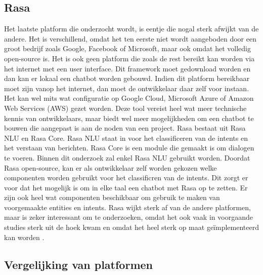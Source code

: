 \subsection{Rasa}
\label{subsec:nlp-platformen-rasa}

Het laatste platform die onderzocht wordt, is eentje die nogal sterk afwijkt van de andere. Het is verschillend, omdat het ten eerste niet wordt aangeboden door een groot bedrijf zoals Google, Facebook of Microsoft, maar ook omdat het volledig open-source is. Het is ook geen platform die zoals de rest bereikt kan worden via het internet met een user interface. Dit framework moet gedownload worden en dan kan er lokaal een chatbot worden gebouwd. Indien dit platform bereikbaar moet zijn vanop het internet, dan moet de ontwikkelaar daar zelf voor instaan. Het kan wel mits wat configuratie op Google Cloud, Microsoft Azure of Amazon Web Services (AWS) gezet worden. Deze tool vereist heel wat meer technische kennis van ontwikkelaars, maar biedt wel meer mogelijkheden om een chatbot te bouwen die aangepast is aan de noden van een project. Rasa bestaat uit Rasa NLU en Rasa Core.  Rasa NLU staat in voor het classificeren van de intents en het verstaan van berichten. Rasa Core is een module die gemaakt is om dialogen te voeren. Binnen dit onderzoek zal enkel Rasa NLU gebruikt worden. Doordat Rasa open-source, kan er als ontwikkelaar zelf worden gekozen welke componenten worden gebruikt voor het classificren van de intents. Dit zorgt er voor dat het mogelijk is om in elke taal een chatbot met Rasa op te zetten. Er zijn ook heel wat componenten beschikbaar om gebruik te maken van voorgemaakte entities en intents. Rasa wijkt sterk af van de andere platformen, maar is zeker interessant om te onderzoeken, omdat het ook vaak in voorgaande studies sterk uit de hoek kwam en omdat het heel sterk op maat geïmplementeerd kan worden \autocite{RASA2020}.

\subsection{Vergelijking van platformen}
\label{subsec:nlp-platformen-vegelijking-platformen}

